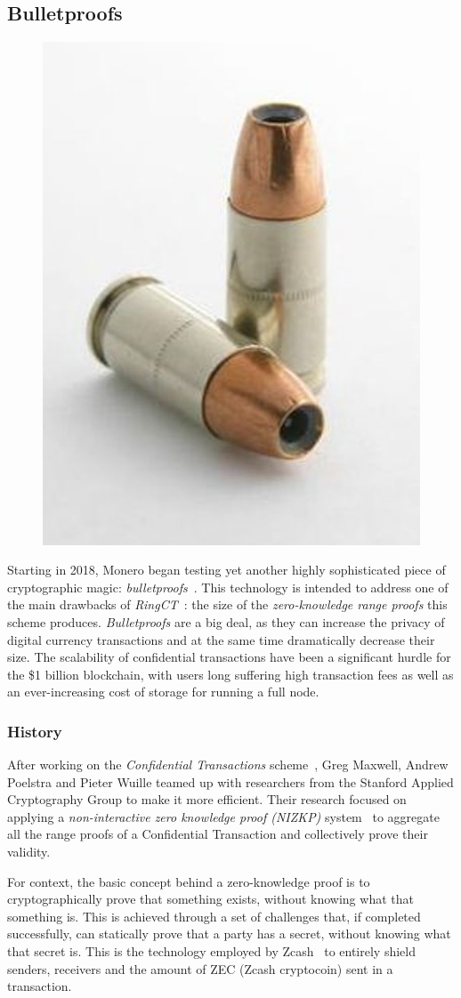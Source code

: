 \subsection{Bulletproofs} \label{sec:bulletproofs}
\begin{figure}
\centering
\includegraphics[height=0.23\textwidth]{Images/Monero/bullet.jpg}
\end{figure}
Starting in 2018, Monero began testing yet another highly sophisticated piece of cryptographic magic: \emph{bulletproofs}~\cite{bulletproofs}. This technology is intended to address one of the main drawbacks of \emph{RingCT}~\cite{ringCT}: the size of the \emph{zero-knowledge range proofs} this scheme produces. \emph{Bulletproofs} are a big deal, as they can increase the privacy of digital currency transactions and at the same time dramatically decrease their size. The scalability of confidential transactions have been a significant hurdle for the \$1 billion blockchain, with users long suffering high transaction fees as well as an ever-increasing cost of storage for running a full node.

\subsubsection{History}
After working on the \emph{Confidential Transactions} scheme~\cite{ringCT}, Greg Maxwell, Andrew Poelstra and Pieter Wuille teamed up with researchers from the Stanford Applied Cryptography Group to make it more efficient. Their research focused on applying a \emph{non-interactive zero knowledge proof (NIZKP)} system~\cite{0_knowledge} to aggregate all the range proofs of a Confidential Transaction and collectively prove their validity.

For context, the basic concept behind a zero-knowledge proof is to cryptographically prove that something exists, without knowing what that something is. This is achieved through a set of challenges that, if completed successfully, can statically prove that a party has a secret, without knowing what that secret is. This is the technology employed by Zcash~\cite{zcash} to entirely shield senders, receivers and the amount of ZEC (Zcash cryptocoin) sent in a transaction.


